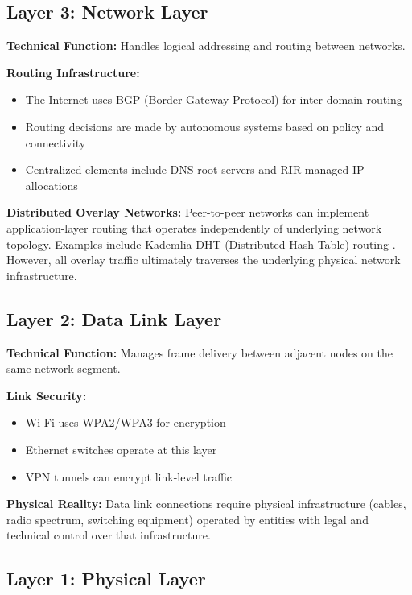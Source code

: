 \documentclass[11pt,a4paper]{article}
\begin{document}
\subsection{Layer 3: Network Layer}

\textbf{Technical Function:} Handles logical addressing and routing between networks.

\textbf{Routing Infrastructure:}
\begin{itemize}[leftmargin=*]
    \item The Internet uses BGP (Border Gateway Protocol) for inter-domain routing
    \item Routing decisions are made by autonomous systems based on policy and connectivity
    \item Centralized elements include DNS root servers and RIR-managed IP allocations
\end{itemize}

\textbf{Distributed Overlay Networks:}
Peer-to-peer networks can implement application-layer routing that operates independently of underlying network topology. Examples include Kademlia DHT (Distributed Hash Table) routing \citep{maymounkov2002}. However, all overlay traffic ultimately traverses the underlying physical network infrastructure.

\subsection{Layer 2: Data Link Layer}

\textbf{Technical Function:} Manages frame delivery between adjacent nodes on the same network segment.

\textbf{Link Security:}
\begin{itemize}[leftmargin=*]
    \item Wi-Fi uses WPA2/WPA3 for encryption
    \item Ethernet switches operate at this layer
    \item VPN tunnels can encrypt link-level traffic
\end{itemize}

\textbf{Physical Reality:}
Data link connections require physical infrastructure (cables, radio spectrum, switching equipment) operated by entities with legal and technical control over that infrastructure.

\subsection{Layer 1: Physical Layer}
\end{document}

